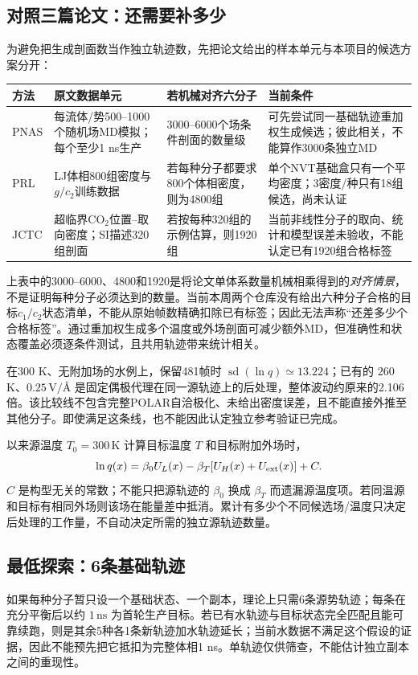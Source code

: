\documentclass[11pt,a4paper]{article}
\begin{document}
\subsection{对照三篇论文：还需要补多少}
为避免把生成剖面数当作独立轨迹数，先把论文给出的样本单元与本项目的候选方案分开：
\begin{center}\small\begin{tabular}{p{2.1cm}p{4.3cm}p{4.1cm}p{3.3cm}}\toprule
方法 & 原文数据单元 & 若机械对齐六分子 & 当前条件 \\\midrule
PNAS & 每流体/势500--1000个随机场MD模拟；每个至少1 ns生产 & 3000--6000个场条件剖面的数量级 & 可先尝试同一基础轨迹重加权生成候选；彼此相关，不能算作3000条独立MD \\
PRL & LJ体相800组密度与$g/c_2$训练数据 & 若每种分子都要求800个体相密度，则为4800组 & 单个NVT基础盒只有一个平均密度；3密度/种只有18组候选，尚未认证 \\
JCTC & 超临界CO$_2$位置--取向密度；SI描述320组剖面 & 若按每种320组的示例估算，则1920组 & 当前非线性分子的取向、统计和模型误差未验收，不能认定已有1920组合格标签 \\\bottomrule
\end{tabular}\end{center}
上表中的3000--6000、4800和1920是将论文单体系数量机械相乘得到的\emph{对齐情景}，不是证明每种分子必须达到的数量。当前本周两个仓库没有给出六种分子合格的目标$c_1/c_2$状态清单，不能从原始帧数精确扣除已有标签；因此无法声称“还差多少个合格标签”。通过重加权生成多个温度或外场剖面可减少额外MD，但准确性和状态覆盖必须逐条件测试，且共用轨迹带来统计相关。

在300 K、无附加场的水例上，保留481帧时 $\operatorname{sd}(\ln q)\simeq13.224$；已有的 $260$ K、$0.25\,\mathrm{V}/\text{\AA}$ 是固定偶极代理在同一源轨迹上的后处理，整体波动约原来的2.106倍。该比较线不包含完整POLAR自洽极化、未给出密度误差，且不能直接外推至其他分子。即使满足这条线，也不能因此认定独立参考验证已完成。

以来源温度 $T_0=300\,\mathrm{K}$ 计算目标温度 $T$ 和目标附加外场时，
\begin{equation}
\ln q(x)=\beta_0 U_L(x)-\beta_T[U_H(x)+U_{\rm ext}(x)]+C.
\end{equation}
$C$ 是构型无关的常数；不能只把源轨迹的 $\beta_0$ 换成 $\beta_T$ 而遗漏源温度项。若同温源和目标有相同外场则该场在能量差中抵消。累计有多少个不同候选场/温度只决定后处理的工作量，不自动决定所需的独立源轨迹数量。

\subsection{最低探索：6条基础轨迹}
如果每种分子暂只设一个基础状态、一个副本，理论上只需6条源势轨迹；每条在充分平衡后以约 $1\,\mathrm{ns}$ 为首轮生产目标。若已有水轨迹与目标状态完全匹配且能可靠续跑，则是其余5种各1条新轨迹加水轨迹延长；当前水数据不满足这个假设的证据，因此不能预先把它抵扣为完整体相1 ns。单轨迹仅供筛查，不能估计独立副本之间的重现性。
\end{document}
